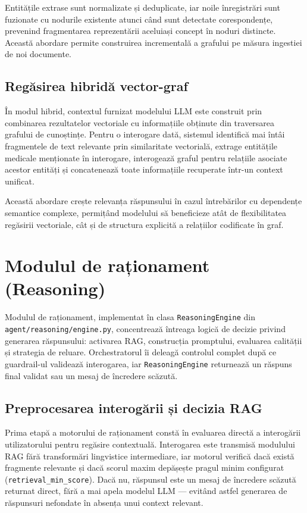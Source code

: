 \documentclass[12pt, a4paper, oneside, romanian]{teza-upb}
\begin{document}
Entitățile extrase sunt normalizate și deduplicate, iar noile înregistrări sunt fuzionate cu nodurile existente atunci când sunt detectate corespondențe, prevenind fragmentarea reprezentării aceluiași concept în noduri distincte. Această abordare permite construirea incrementală a grafului pe măsura ingestiei de noi documente.

\subsection{Regăsirea hibridă vector-graf}

În modul hibrid, contextul furnizat modelului LLM este construit prin combinarea rezultatelor vectoriale cu informațiile obținute din traversarea grafului de cunoștințe. Pentru o interogare dată, sistemul identifică mai întâi fragmentele de text relevante prin similaritate vectorială, extrage entitățile medicale menționate în interogare, interogează graful pentru relațiile asociate acestor entități și concatenează toate informațiile recuperate într-un context unificat.

Această abordare crește relevanța răspunsului în cazul întrebărilor cu dependențe semantice complexe, permițând modelului să beneficieze atât de flexibilitatea regăsirii vectoriale, cât și de structura explicită a relațiilor codificate în graf.

\section{Modulul de raționament (Reasoning)}
\label{sec:reasoning}

Modulul de raționament, implementat în clasa \texttt{ReasoningEngine} din \texttt{agent/reasoning/engine.py}, concentrează întreaga logică de decizie privind generarea răspunsului: activarea RAG, construcția promptului, evaluarea calității și strategia de reluare. Orchestratorul îi deleagă controlul complet după ce guardrail-ul validează interogarea, iar \texttt{ReasoningEngine} returnează un răspuns final validat sau un mesaj de încredere scăzută.

\subsection{Preprocesarea interogării și decizia RAG}

Prima etapă a motorului de raționament constă în evaluarea directă a interogării utilizatorului pentru regăsire contextuală. Interogarea este transmisă modulului RAG fără transformări lingvistice intermediare, iar motorul verifică dacă există fragmente relevante și dacă scorul maxim depășește pragul minim configurat (\texttt{retrieval\_min\_score}). Dacă nu, răspunsul este un mesaj de încredere scăzută returnat direct, fără a mai apela modelul LLM — evitând astfel generarea de răspunsuri nefondate în absența unui context relevant.
\end{document}
